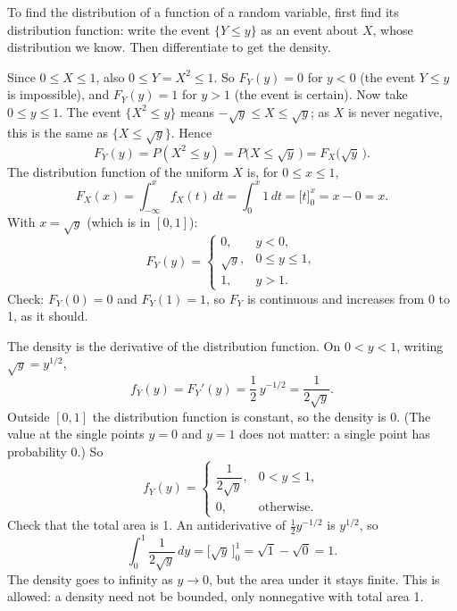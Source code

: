 \begin{solution}
	\idea To find the distribution of a function of a random variable, first find
	its distribution function: write the event $\{Y\le y\}$ as an event about $X$,
	whose distribution we know. Then differentiate to get the density.

	 Since $0\le X\le1$, also $0\le Y=X^2\le1$. So $F_Y(y)=0$ for
	$y<0$ (the event $Y\le y$ is impossible), and $F_Y(y)=1$ for $y>1$ (the event
	is certain). Now take $0\le y\le1$. The event $\{X^2\le y\}$ means
	$-\sqrt y\le X\le\sqrt y$; as $X$ is never negative, this is the same as
	$\{X\le\sqrt y\}$. Hence
	\[ F_Y(y)=P(X^2\le y)=P\big(X\le\sqrt y\,\big)=F_X\big(\sqrt y\,\big). \]
	The distribution function of the uniform $X$ is, for $0\le x\le1$,
	\[ F_X(x)=\int_{-\infty}^{x}f_X(t)\,dt=\int_0^x1\,dt=\big[t\big]_0^x=x-0=x. \]
	With $x=\sqrt y$ (which is in $[0,1]$):
	\[ F_Y(y)=\begin{cases}
			0,       & y<0,         \\
			\sqrt y, & 0\le y\le1, \\
			1,       & y>1.
		\end{cases} \]
	Check: $F_Y(0)=0$ and $F_Y(1)=1$, so $F_Y$ is continuous and increases from
	0 to 1, as it should.

	 The density is the derivative of the distribution function.
	On $0<y<1$, writing $\sqrt y=y^{1/2}$,
	\[ f_Y(y)=F_Y'(y)=\frac12\,y^{-1/2}=\frac{1}{2\sqrt y}. \]
	Outside $[0,1]$ the distribution function is constant, so the density is 0.
	(The value at the single points $y=0$ and $y=1$ does not matter: a single
	point has probability 0.) So
	\[ f_Y(y)=\begin{cases}
			\dfrac{1}{2\sqrt y}, & 0<y\le1,    \\[2mm]
			0,                   & \text{otherwise}.
		\end{cases} \]
	Check that the total area is 1. An antiderivative of $\frac12 y^{-1/2}$ is
	$y^{1/2}$, so
	\[ \int_0^1\frac{1}{2\sqrt y}\,dy=\big[\sqrt y\,\big]_0^1=\sqrt1-\sqrt0=1. \]
	The density goes to infinity as $y\to0$, but the area under it stays finite.
	This is allowed: a density need not be bounded, only nonnegative with total
	area 1.


\end{solution}
